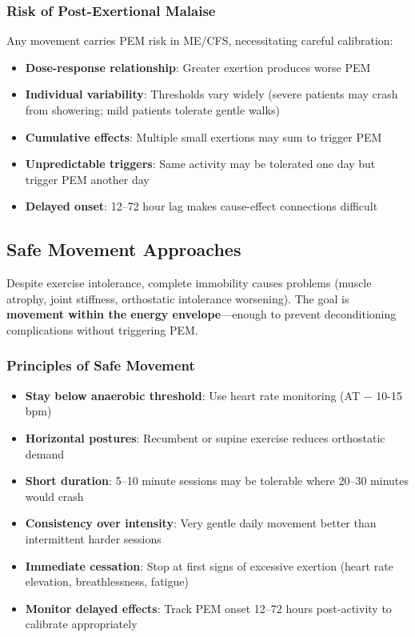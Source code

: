 \subsubsection{Risk of Post-Exertional Malaise}

Any movement carries PEM risk in ME/CFS, necessitating careful calibration:

\begin{itemize}
    \item \textbf{Dose-response relationship}: Greater exertion produces worse PEM
    \item \textbf{Individual variability}: Thresholds vary widely (severe patients may crash from showering; mild patients tolerate gentle walks)
    \item \textbf{Cumulative effects}: Multiple small exertions may sum to trigger PEM
    \item \textbf{Unpredictable triggers}: Same activity may be tolerated one day but trigger PEM another day
    \item \textbf{Delayed onset}: 12--72 hour lag makes cause-effect connections difficult
\end{itemize}

\subsection{Safe Movement Approaches}

Despite exercise intolerance, complete immobility causes problems (muscle atrophy, joint stiffness, orthostatic intolerance worsening). The goal is \textbf{movement within the energy envelope}---enough to prevent deconditioning complications without triggering PEM.

\subsubsection{Principles of Safe Movement}

\begin{itemize}
    \item \textbf{Stay below anaerobic threshold}: Use heart rate monitoring (AT $-$ 10-15 bpm)
    \item \textbf{Horizontal postures}: Recumbent or supine exercise reduces orthostatic demand
    \item \textbf{Short duration}: 5--10 minute sessions may be tolerable where 20--30 minutes would crash
    \item \textbf{Consistency over intensity}: Very gentle daily movement better than intermittent harder sessions
    \item \textbf{Immediate cessation}: Stop at first signs of excessive exertion (heart rate elevation, breathlessness, fatigue)
    \item \textbf{Monitor delayed effects}: Track PEM onset 12--72 hours post-activity to calibrate appropriately
\end{itemize}

